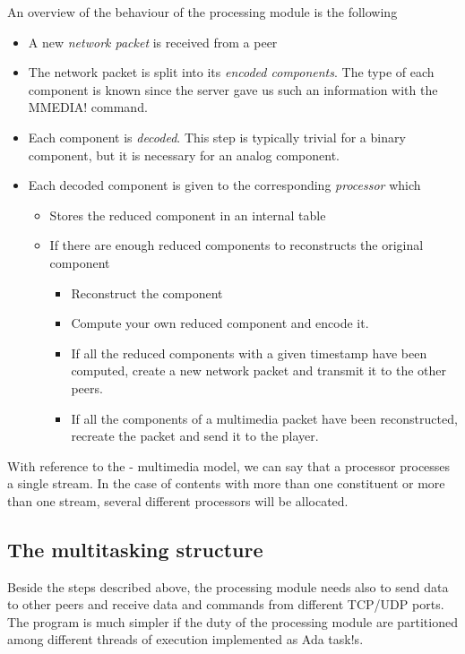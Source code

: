 \documentclass{medusabook}
\begin{document}
An overview of the behaviour of the processing module is the following
\begin{itemize}
\item
A new \emph{network packet} is received from a peer
\item
The network packet is split into its \emph{encoded components}.  The
type of each component is known since the server gave us such an
information with the \ttt MMEDIA! command.
\item
Each component is  \emph{decoded}.  This step is typically trivial for
a binary component, but it is necessary for an analog component.
\item
Each decoded component is given to the
corresponding \emph{processor} which 
\begin{itemize}
  \item
    Stores the reduced component in an internal table
  \item
    If there are enough reduced components to reconstructs the original
    component 
    \begin{itemize}
      \item
        Reconstruct the component
      \item
        Compute your own reduced component and encode it. 
      \item
        If all the reduced components with a given timestamp have been
        computed, create a new network packet and transmit it to the
        other peers.
      \item
        If all the components of a multimedia packet have been
        reconstructed, recreate the packet and send it to the player.
    \end{itemize}
\end{itemize}
\end{itemize}
%
With reference to the \medusa- multimedia model, we can say that a
processor processes a single stream.  In the case of contents with
more than one constituent or more than one stream, several different
processors will be allocated.

\subsection{The multitasking structure}
\label{sub:0.1.0;dsp_book}

Beside the steps described above, the processing module needs also to
send data to other peers and receive data and commands from different
TCP/UDP ports.  The program is much simpler if the duty of the
processing module are partitioned among different threads of
execution implemented as Ada \ttt task!s.
\end{document}
